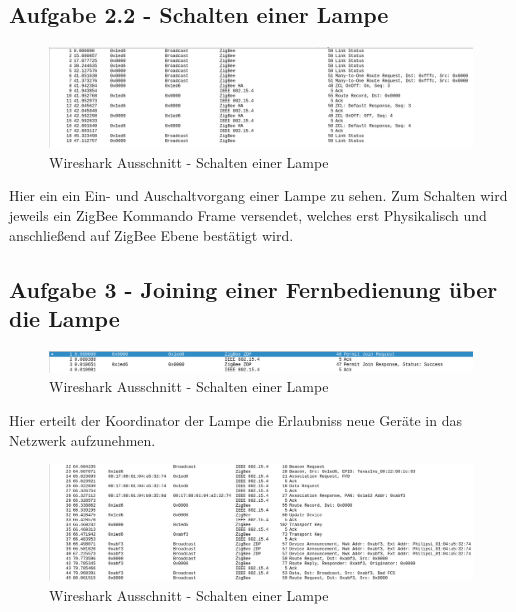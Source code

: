 \subsection{Aufgabe 2.2 - Schalten einer Lampe}

\begin{figure}[H]
    \centering
    \includegraphics[width=1\textwidth]{media/lsg2.2.png}
    \caption{Wireshark Ausschnitt - Schalten einer Lampe}
\end{figure}

Hier ein ein Ein- und Auschaltvorgang einer Lampe zu sehen. Zum Schalten wird jeweils ein \grqq ZigBee Kommando Frame\grqq{} versendet, welches erst Physikalisch und 
anschließend auf ZigBee Ebene bestätigt wird.

\subsection{Aufgabe 3 - Joining einer Fernbedienung über die Lampe}

\begin{figure}[H]
    \centering
    \includegraphics[width=1\textwidth]{media/lsg-3-1.png}
    \caption{Wireshark Ausschnitt - Schalten einer Lampe}
\end{figure}

Hier erteilt der Koordinator der Lampe die Erlaubniss neue Geräte in das Netzwerk aufzunehmen.

\begin{figure}[H]
    \centering
    \includegraphics[width=1\textwidth]{media/lsg-3-2.png}
    \caption{Wireshark Ausschnitt - Schalten einer Lampe}
\end{figure}

